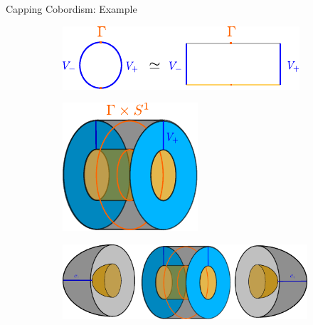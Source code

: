 \documentclass{beamer}
\begin{document}
\begin{frame}{Capping Cobordism: Example}
    \begin{figure}
        \begin{subfigure}[t]{.54\linewidth}
            \includegraphics[trim=-.3cm -.5cm -.3cm -.5cm, width=\linewidth]{../images/convex_decomposition_of_s1.pdf}
        \end{subfigure}
        \begin{subfigure}[t]{.35\linewidth}
            \includegraphics[trim=-.5cm -.5cm -.5cm -.5cm, width=\linewidth]{../images/v_times_s1.pdf}
        \end{subfigure}
        \begin{subfigure}{.8\linewidth}
            \includegraphics[trim=-.5cm -.5cm -.5cm -.5cm, width=\linewidth]{../images/capping_cobordism_talk.pdf}
        \end{subfigure}
    \end{figure}
\end{frame}
\end{document}
